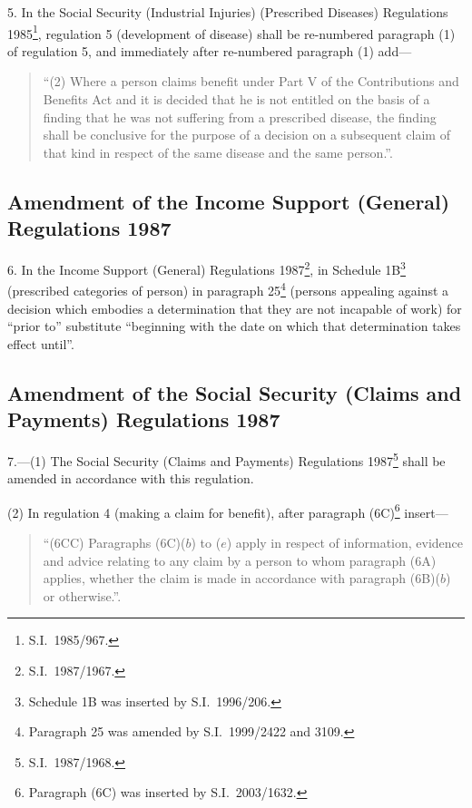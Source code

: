\documentclass[12pt,a4paper]{article}
\begin{document}
5.  In the Social Security (Industrial Injuries) (Prescribed Diseases) Regulations 1985\footnote{S.I.\ 1985/967.}, regulation 5 (development of disease) shall be re-numbered paragraph (1) of regulation 5, and immediately after re-numbered paragraph (1) add—
\begin{quotation}
“(2) Where a person claims benefit under Part V of the Contributions and Benefits Act and it is decided that he is not entitled on the basis of a finding that he was not suffering from a prescribed disease, the finding shall be conclusive for the purpose of a decision on a subsequent claim of that kind in respect of the same disease and the same person.”.
\end{quotation}

\subsection[6. Amendment of the Income Support (General) Regulations 1987]{\sloppy Amendment of the Income Support (General) Regulations 1987}

6.  In the Income Support (General) Regulations 1987\footnote{S.I.\ 1987/1967.}, in Schedule 1B\footnote{Schedule 1B was inserted by S.I.\ 1996/206.} (prescribed categories of person) in paragraph 25\footnote{Paragraph 25 was amended by S.I.\ 1999/2422 and 3109.} (persons appealing against a decision which embodies a determination that they are not incapable of work) for “prior to” substitute “beginning with the date on which that determination takes effect until”.

\subsection[7. Amendment of the Social Security (Claims and Payments) Regulations 1987]{Amendment of the Social Security (Claims and Payments) Regulations 1987}

7.---(1)  The Social Security (Claims and Payments) Regulations 1987\footnote{S.I.\ 1987/1968.} shall be amended in accordance with this regulation.

(2) In regulation 4 (making a claim for benefit), after paragraph (6C)\footnote{Paragraph (6C) was inserted by S.I.\ 2003/1632.} insert—
\begin{quotation}
“(6CC) Paragraphs (6C)($b$)  to ($e$)  apply in respect of information, evidence and advice relating to any claim by a person to whom paragraph (6A) applies, whether the claim is made in accordance with paragraph (6B)($b$)  or otherwise.”.
\end{quotation}
\end{document}
